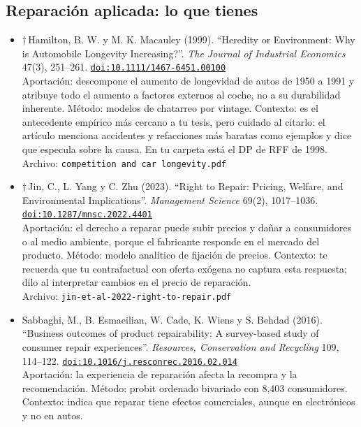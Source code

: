 \documentclass[11pt]{article}
\begin{document}
\subsection*{Reparación aplicada: lo que tienes}
\begin{itemize}
\item $\dagger$\,Hamilton, B. W. y M. K. Macauley (1999). ``Heredity or Environment: Why is Automobile Longevity Increasing?''. \textit{The Journal of Industrial Economics} 47(3), 251--261. \href{https://doi.org/10.1111/1467-6451.00100}{\texttt{doi:10.1111/1467-6451.00100}}\\
Aportación: descompone el aumento de longevidad de autos de 1950 a 1991 y atribuye todo el aumento a factores externos al coche, no a su durabilidad inherente. Método: modelos de chatarreo por vintage. Contexto: es el antecedente empírico más cercano a tu tesis, pero cuidado al citarlo: el artículo menciona accidentes y refacciones más baratas como ejemplos y dice que especula sobre la causa. En tu carpeta está el DP de RFF de 1998.\\
{\footnotesize Archivo: \texttt{competition and car longevity.pdf}}
\item $\dagger$\,Jin, C., L. Yang y C. Zhu (2023). ``Right to Repair: Pricing, Welfare, and Environmental Implications''. \textit{Management Science} 69(2), 1017--1036. \href{https://doi.org/10.1287/mnsc.2022.4401}{\texttt{doi:10.1287/mnsc.2022.4401}}\\
Aportación: el derecho a reparar puede subir precios y dañar a consumidores o al medio ambiente, porque el fabricante responde en el mercado del producto. Método: modelo analítico de fijación de precios. Contexto: te recuerda que tu contrafactual con oferta exógena no captura esta respuesta; dilo al interpretar cambios en el precio de reparación.\\
{\footnotesize Archivo: \texttt{jin-et-al-2022-right-to-repair.pdf}}
\item Sabbaghi, M., B. Esmaeilian, W. Cade, K. Wiens y S. Behdad (2016). ``Business outcomes of product repairability: A survey-based study of consumer repair experiences''. \textit{Resources, Conservation and Recycling} 109, 114--122. \href{https://doi.org/10.1016/j.resconrec.2016.02.014}{\texttt{doi:10.1016/j.resconrec.2016.02.014}}\\
Aportación: la experiencia de reparación afecta la recompra y la recomendación. Método: probit ordenado bivariado con 8,403 consumidores. Contexto: indica que reparar tiene efectos comerciales, aunque en electrónicos y no en autos.\\

\end{itemize}
\end{document}
